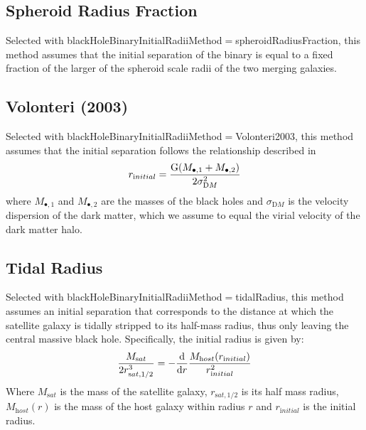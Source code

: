 \subsection{Spheroid Radius Fraction}

Selected with {\normalfont \ttfamily blackHoleBinaryInitialRadiiMethod}$=${\normalfont \ttfamily spheroidRadiusFraction}, this method assumes that the initial separation of the binary is equal to a fixed fraction {\normalfont \ttfamily [blackHoleInitialRadiusSpheroidRadiusRatio]} of the larger of the spheroid scale radii of the two merging galaxies.

\subsection{Volonteri (2003)}

Selected with {\normalfont \ttfamily blackHoleBinaryInitialRadiiMethod}$=${\normalfont \ttfamily Volonteri2003}, this method assumes that the initial separation follows the relationship described in \cite{volonteri_assembly_2003} 
\begin{equation}
 r_{\mathrm initial} = { {\mathrm G} (M_{\bullet,1} + M_{\bullet, 2}) \over 2
\sigma_{\mathrm DM}^2 }
\end{equation}
where $M_{\bullet, 1}$ and $M_{\bullet, 2}$ are the masses of the black holes
and $\sigma_{\mathrm DM}$ is the velocity dispersion of the dark matter, which we
assume to equal the virial velocity of the dark matter halo.

\subsection{Tidal Radius}

Selected with {\normalfont \ttfamily blackHoleBinaryInitialRadiiMethod}$=${\normalfont \ttfamily tidalRadius}, this method assumes an initial separation that corresponds to the distance at which the satellite galaxy is tidally stripped to its half-mass radius, thus only leaving the central massive black hole.
Specifically, the initial radius is given by:
\begin{equation}
{M_{\mathrm sat} \over 2 r_{\mathrm sat,1/2}^3 } = - {{\mathrm d} \over {\mathrm d} r} {M_{\mathrm host}(r_{\mathrm initial}) \over r_{\mathrm initial}^2}
\end{equation}
Where $M_{\mathrm sat}$ is the mass of the satellite galaxy, $r_{\mathrm sat,1/2}$ is its half mass radius, $M_{\mathrm host}(r)$ is the mass of the host galaxy within radius $r$ and $r_{\mathrm initial}$ is the initial radius.

